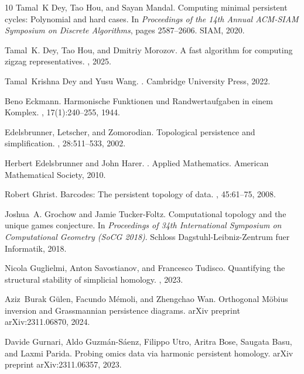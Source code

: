 \documentclass[10pt,a4paper]{amsart}
\theoremstyle{definition}
\theoremstyle{remark}
\begin{document}
\begin{thebibliography}{10}
Tamal~K Dey, Tao Hou, and Sayan Mandal.
\newblock Computing minimal persistent cycles: Polynomial and hard cases.
\newblock In {\em Proceedings of the 14th Annual {ACM-SIAM} Symposium on
  Discrete Algorithms}, pages 2587--2606. SIAM, 2020.

Tamal~K. Dey, Tao Hou, and Dmitriy Morozov.
\newblock A fast algorithm for computing zigzag representatives.
, 2025.

Tamal~Krishna Dey and Yusu Wang.
.
\newblock Cambridge University Press, 2022.

Beno Eckmann.
\newblock Harmonische {F}unktionen und {R}andwertaufgaben in einem {K}omplex.
, 17(1):240--255, 1944.

Edelsbrunner, Letscher, and Zomorodian.
\newblock Topological persistence and simplification.
, 28:511--533, 2002.

Herbert Edelsbrunner and John Harer.
.
\newblock Applied Mathematics. American Mathematical Society, 2010.

Robert Ghrist.
\newblock Barcodes: The persistent topology of data.
, 45:61--75,
  2008.

Joshua~A. Grochow and Jamie Tucker-Foltz.
\newblock Computational topology and the unique games conjecture.
\newblock In {\em Proceedings of 34th International Symposium on Computational
  Geometry (SoCG 2018)}. Schloss Dagstuhl-Leibniz-Zentrum fuer Informatik,
  2018.

Nicola Guglielmi, Anton Savostianov, and Francesco Tudisco.
\newblock Quantifying the structural stability of simplicial homology.
, 2023.

Aziz~Burak G{\"u}len, Facundo M{\'e}moli, and Zhengchao Wan.
\newblock Orthogonal {M}\"obius inversion and {G}rassmannian persistence
  diagrams.
\newblock arXiv preprint arXiv:2311.06870, 2024.

Davide Gurnari, Aldo Guzm{\'a}n-S{\'a}enz, Filippo Utro, Aritra Bose, Saugata
  Basu, and Laxmi Parida.
\newblock Probing omics data via harmonic persistent homology.
\newblock arXiv preprint arXiv:2311.06357, 2023.


\end{thebibliography}
\end{document}
